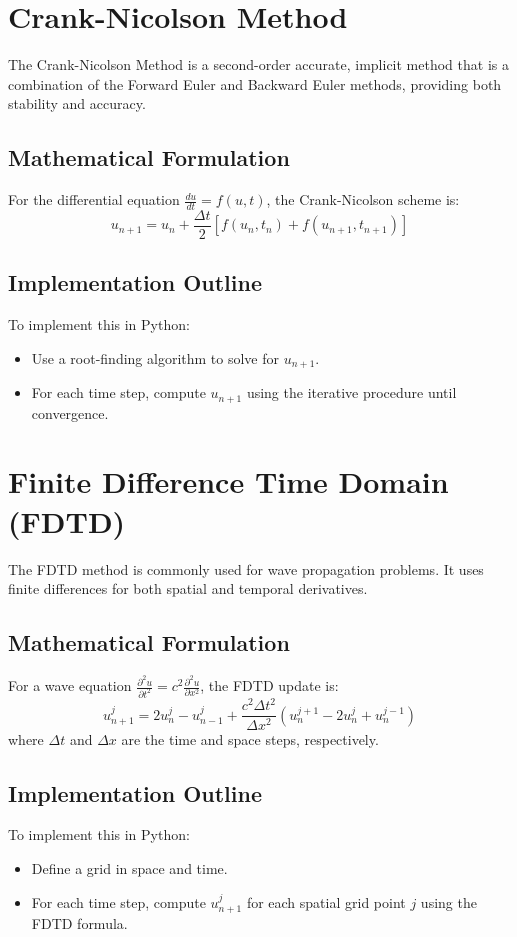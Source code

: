 \documentclass{article}
\begin{document}
\section{Crank-Nicolson Method}
The Crank-Nicolson Method is a second-order accurate, implicit method that is a combination of the Forward Euler and Backward Euler methods, providing both stability and accuracy.

\subsection{Mathematical Formulation}
For the differential equation $\frac{du}{dt} = f(u, t)$, the Crank-Nicolson scheme is:
\[
u_{n+1} = u_n + \frac{\Delta t}{2} \left[ f(u_n, t_n) + f(u_{n+1}, t_{n+1}) \right]
\]

\subsection{Implementation Outline}
To implement this in Python:
\begin{itemize}
    \item Use a root-finding algorithm to solve for $u_{n+1}$.
    \item For each time step, compute $u_{n+1}$ using the iterative procedure until convergence.
\end{itemize}

\section{Finite Difference Time Domain (FDTD)}
The FDTD method is commonly used for wave propagation problems. It uses finite differences for both spatial and temporal derivatives.

\subsection{Mathematical Formulation}
For a wave equation $\frac{\partial^2 u}{\partial t^2} = c^2 \frac{\partial^2 u}{\partial x^2}$, the FDTD update is:
\[
u_{n+1}^j = 2 u_n^j - u_{n-1}^j + \frac{c^2 \Delta t^2}{\Delta x^2} \left( u_n^{j+1} - 2 u_n^j + u_n^{j-1} \right)
\]
where $\Delta t$ and $\Delta x$ are the time and space steps, respectively.

\subsection{Implementation Outline}
To implement this in Python:
\begin{itemize}
    \item Define a grid in space and time.
    \item For each time step, compute $u_{n+1}^j$ for each spatial grid point $j$ using the FDTD formula.
\end{itemize}
\end{document}
